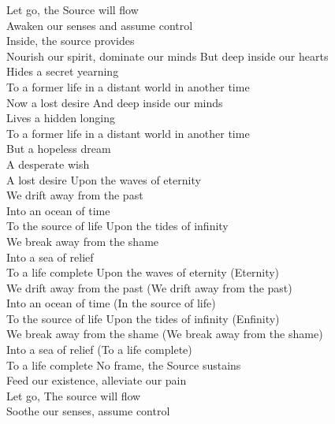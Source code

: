 Let go, the Source will flow\tab{}\\
Awaken our senses and assume control\\
Inside, the source provides\tab{}\\
Nourish our spirit, dominate our minds
\hop
But deep inside our hearts\tab{}\tab{}\\
Hides a secret yearning\tab{}\tab{}\\
To a former life in a distant world in another time\\
Now a lost desire \tab{}\tab{}
\hop
And deep inside our minds\tab{}\tab{}\\
Lives a hidden longing\tab{}\tab{}\\
To a former life in a distant world in another time\\
But a hopeless dream\tab{}\tab{}\\
A desperate wish\tab{}\tab{}\\
A lost desire\tab{}\tab{}\tab{}
\hops
{} Upon the waves of eternity\\
 We drift away from the past\\
 Into an ocean of time\tab{}\\
 To the source of life\tab{}
\hop
{} Upon the tides of infinity\tab{}\\
 We break away from the shame\\
 Into a sea of relief\tab{}\\
 To a life complete\tab{}
\hops
{} Upon the waves of eternity (Eternity)\\
 We drift away from the past (We drift away from the past)\\
 Into an ocean of time (In the source of life)\\
 To the source of life
\hop
{} Upon the tides of infinity (Enfinity)\\
 We break away from the shame (We break away from the shame)\\
 Into a sea of relief (To a life complete)\\
 To a life complete\tab{}
\hops
No frame, the Source sustains\\
Feed our existence, alleviate our pain\\
Let go, The source will flow\\
Soothe our senses, assume control